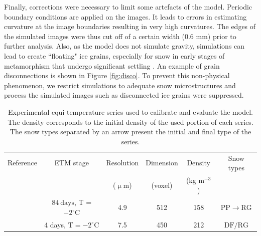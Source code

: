 \documentclass[draft,ms]{agujournal2019}
\begin{document}
Finally, corrections were necessary to limit some artefacts of the model. Periodic boundary conditions are applied on the images. It leads to errors in estimating curvature at the image boundaries resulting in very high curvatures. The edges of the simulated images were thus cut off of a certain width (0.6 mm) prior to further analysis. Also, as the model does not simulate gravity, simulations can lead to create ``floating" ice grains,  especially for snow in early stages of metamorphism that undergo significant settling \cite{schleef2014influence}. An example of grain disconnections is shown in Figure \ref{fig:disco}. To prevent this non-physical phenomenon, we restrict simulations to adequate snow microstructures and process the simulated images such as disconnected ice grains were suppressed. 





\begin{table}
\hspace*{-0.5cm}
\begin{tabular}{|c|c|c|c|c|c|}
\hline Reference & ETM stage & Resolution & Dimension & Density & Snow types \\
 &  & ($\upmu$m) &(voxel) & (kg m$^{-3}$) &  \\
\hline 
\cite{flin_three-dimensional_2004} & $84\ \mathrm{days}$, T = $-2^{\circ} \mathrm{C}$ & 4.9 & 512 & 158 & \small{$\mathrm{PP} \rightarrow \mathrm{RG}$} \\
\cite{hagenmuller_motion_2019} & 4 days, $\mathrm{T}=-2^{\circ} \mathrm{C}$ & 7.5 & 450 & 212 & \small{$\mathrm{DF/RG}$} \\
\hline
\end{tabular}
\caption{Experimental equi-temperature series used to calibrate and evaluate the model. The density corresponds to the initial density of the used portion of each series. The snow types separated by an arrow present the initial and final type of the series.}
\label{tab:series_exp}
\end{table}
\end{document}
